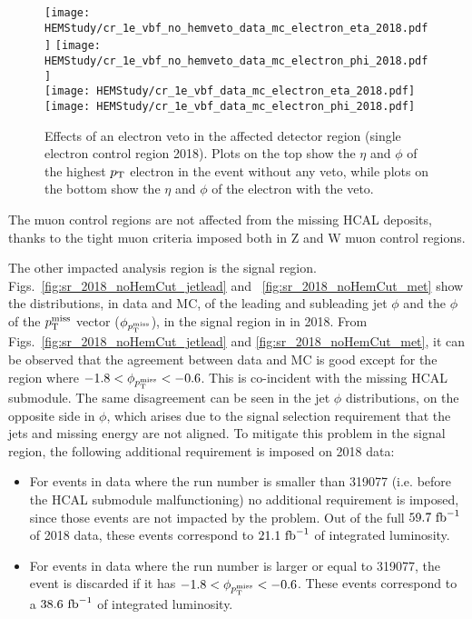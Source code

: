 \begin{figure}[htbp]
    \begin{center}
        \texttt{[image: HEMStudy/cr\_1e\_vbf\_no\_hemveto\_data\_mc\_electron\_eta\_2018.pdf]}
        \texttt{[image: HEMStudy/cr\_1e\_vbf\_no\_hemveto\_data\_mc\_electron\_phi\_2018.pdf]} \\
        \texttt{[image: HEMStudy/cr\_1e\_vbf\_data\_mc\_electron\_eta\_2018.pdf]}
        \texttt{[image: HEMStudy/cr\_1e\_vbf\_data\_mc\_electron\_phi\_2018.pdf]}
    \end{center}
    \caption{Effects of an electron veto in the affected detector region (single electron control region 2018). 
    Plots on the top show the $\eta$ and $\phi$ of the highest $p_{\textrm{T}}$ electron in the event
    without any veto, while plots on the bottom show the $\eta$ and $\phi$ of the electron with the veto.}
    \label{fig:HEM_motivation}
\end{figure}

The muon control regions are not affected from the missing HCAL deposits, 
thanks to the tight muon criteria imposed both in Z and W muon control regions.

The other impacted analysis region is the signal region. 
Figs.~\ref{fig:sr_2018_noHemCut_jetlead} and ~\ref{fig:sr_2018_noHemCut_met} show the distributions, in data and MC, of the leading and subleading 
jet $\phi$ and the $\phi$ of the $p_{\textrm{T}}^{\textrm{miss}}$ vector ($\phi_{p_{\textrm{T}}^{\textrm{miss}}}$), in the signal region in in 2018. 
From Figs.~\ref{fig:sr_2018_noHemCut_jetlead} and \ref{fig:sr_2018_noHemCut_met}, it can be observed that the agreement between data and MC is good 
except for the region where $-1.8 < \phi_{p_{\textrm{T}}^{\textrm{miss}}} < -0.6$. This is co-incident 
with the missing HCAL submodule. The same disagreement can be seen in the jet $\phi$ distributions, on the opposite side in $\phi$, 
which arises due to the signal selection requirement that the jets and missing energy are not aligned.
To mitigate this problem in the signal region, the following additional requirement is imposed on 2018 data:

\begin{itemize}
    \item For events in data where the run number is smaller than 319077 (i.e. before the HCAL submodule malfunctioning)
    no additional requirement is imposed, since those events are not impacted by the problem. Out of the full $59.7 \ \fbinv$
    of 2018 data, these events correspond to $21.1 \ \textrm{fb}^{-1}$ of integrated luminosity.
    \item For events in data where the run number is larger or equal to 319077, the event is discarded
    if it has $-1.8 < \phi_{p_{\textrm{T}}^{\textrm{miss}}} < -0.6$. These events correspond to a $38.6 \ \textrm{fb}^{-1}$ of integrated luminosity. 
\end{itemize}

